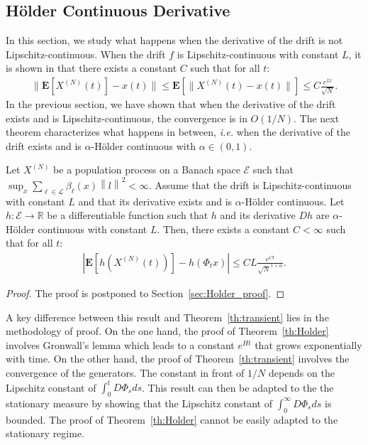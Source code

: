 \documentclass[sigconf]{acmart}
\newcommand\XN{X^{(N)}}
\newcommand\E{\mathcal{E}}
\newcommand\R{\mathbb{R}}
\newcommand\calL{\mathcal{L}}
\newcommand\esp[1]{\mathbf{E}\left[#1\right]}
\newcommand\sesp[1]{\mathbf{E}[#1]}
\newcommand\norm[1]{\left\|#1\right\|}
\newcommand\snorm[1]{\|#1\|}
\newcommand\abs[1]{\left|#1\right|}
\begin{document}
\subsection{Hölder Continuous Derivative}
\label{sec:holder}

In this section, we study what happens when the derivative of the
drift is not Lipschitz-continuous.  When the drift $f$ is
Lipschitz-continuous with constant $L$, it is shown in \cite{kurtz70}
that there exists a constant $C$ such that for all $t$:
\begin{align*}
  \snorm{\sesp{\XN(t)}-x(t)}\le \sesp{\snorm{\XN(t)-x(t)}}\le C
  \frac{e^{Lt}}{\sqrt{N}}. 
\end{align*}
In the previous section, we have shown that when the derivative of
the drift exists and is Lipschitz-continuous, the convergence is in
$O(1/N)$.  The next theorem characterizes what happens in between,
\emph{i.e.}  when the derivative of the drift exists and is
$\alpha$-Hölder continuous with $\alpha\in(0,1)$. 
\begin{theorem}
  \label{th:Holder}
  Let $\XN$ be a population process on a Banach space $\E$ such that
  $\sup_x\sum_{\ell\in\calL}\beta_\ell(x)\norm{l}^2<\infty$. Assume
  that the drift is Lipschitz-continuous with constant $L$ and that
  its derivative exists and is $\alpha$-Hölder continuous.  Let
  $h:\E\to\R$ be a differentiable function such that $h$ and its
  derivative $Dh$ are $\alpha$-Hölder continuous with constant
  $L$. Then, there exists a constant $C<\infty$ such that for all $t$:
  \begin{align*}
    \abs{\esp{h(\XN(t))}-h(\Phi_tx)} \le CL\frac{e^{Ct}}{\sqrt{N}^{1+\alpha}}.
  \end{align*}
\end{theorem}
\begin{proof}
  The proof is postponed to Section~\ref{sec:Holder_proof}.  
\end{proof}

A key difference between this result and Theorem~\ref{th:transient}
lies in the methodology of proof. On the one hand, the proof of
Theorem~\ref{th:Holder} involves Gronwall's lemma which leads to a
constant $e^{Ht}$ that grows exponentially with time. On the other
hand, the proof of Theorem~\ref{th:transient} involves the convergence
of the generators. The constant in front of $1/N$ depends on the
Lipschitz constant of $\int_0^tD\Phi_sds$.  This result can then be
adapted to the the stationary measure by showing that the Lipschitz
constant of $\int_0^\infty D\Phi_sds$ is bounded. The proof of
Theorem~\ref{th:Holder} cannot be easily adapted to the stationary
regime.
\end{document}
